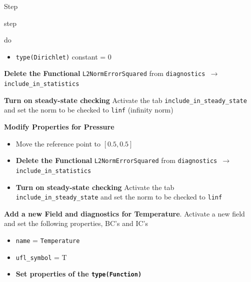 \begin{steps}{Step}
\begin{steps}{step}
\begin{steps}{do}
\begin{itemize}
        \item \texttt{type(Dirichlet)} constant = 0
        \end{itemize}
      \item \textbf{Delete the Functional} \texttt{L2NormErrorSquared}
      from \texttt{diagnostics $\rightarrow$ include\_in\_statistics}
    \item \textbf{Turn on steady-state checking} Activate the tab
      \texttt{include\_in\_steady\_state} and set the norm to be
      checked to \texttt{linf} (infinity norm)
      \end{steps}
    \item \textbf{Modify Properties for Pressure}
      \begin{itemize}
      \item Move the reference point to $[0.5, 0.5]$
      \item \textbf{Delete the Functional} \texttt{L2NormErrorSquared}  from \texttt{diagnostics $\rightarrow$ include\_in\_statistics}
      \item \textbf{Turn on steady-state checking} Activate the tab
      \texttt{include\_in\_steady\_state} and set the norm to be
      checked to \texttt{linf}
      \end{itemize}
    \item \textbf{Add a new Field and diagnostics for Temperature}.
      Activate a new field and set the following properties, BC's and IC's
      \begin{itemize}
      \item \texttt{name} = \texttt{Temperature}
      \item \texttt{ufl\_symbol} = T
      \item \textbf{Set properties of the \texttt{type(Function)}}
\end{itemize}
\end{steps}
\end{steps}
